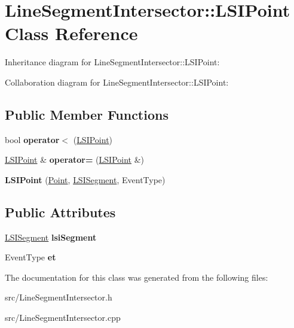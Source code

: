 \hypertarget{classLineSegmentIntersector_1_1LSIPoint}{}\section{Line\+Segment\+Intersector\+:\+:L\+S\+I\+Point Class Reference}
\label{classLineSegmentIntersector_1_1LSIPoint}


Inheritance diagram for Line\+Segment\+Intersector\+:\+:L\+S\+I\+Point\+:


Collaboration diagram for Line\+Segment\+Intersector\+:\+:L\+S\+I\+Point\+:
\subsection*{Public Member Functions}
\begin{DoxyCompactItemize}
\item 
\mbox{\label{classLineSegmentIntersector_1_1LSIPoint_a1b3ac13032c42bad86516cbcf953db66}} 
bool {\bfseries operator$<$} (\hyperlink{classLineSegmentIntersector_1_1LSIPoint}{L\+S\+I\+Point})
\item 
\mbox{\label{classLineSegmentIntersector_1_1LSIPoint_ac547954aaa117fd416bb84a4a7447e56}} 
\hyperlink{classLineSegmentIntersector_1_1LSIPoint}{L\+S\+I\+Point} \& {\bfseries operator=} (\hyperlink{classLineSegmentIntersector_1_1LSIPoint}{L\+S\+I\+Point} \&)
\item 
\mbox{\label{classLineSegmentIntersector_1_1LSIPoint_a00b901f7dd62d86e3523c6592e9c1514}} 
{\bfseries L\+S\+I\+Point} (\hyperlink{classPoint}{Point}, \hyperlink{classLineSegmentIntersector_1_1LSISegment}{L\+S\+I\+Segment}, Event\+Type)
\end{DoxyCompactItemize}
\subsection*{Public Attributes}
\begin{DoxyCompactItemize}
\item 
\mbox{\label{classLineSegmentIntersector_1_1LSIPoint_ab84e13cb9e39eeca6d8af71d4b09582d}} 
\hyperlink{classLineSegmentIntersector_1_1LSISegment}{L\+S\+I\+Segment} {\bfseries lsi\+Segment}
\item 
\mbox{\label{classLineSegmentIntersector_1_1LSIPoint_a01054b1139f1e58e5af7b45213dd3c57}} 
Event\+Type {\bfseries et}
\end{DoxyCompactItemize}


The documentation for this class was generated from the following files\+:\begin{DoxyCompactItemize}
\item 
src/Line\+Segment\+Intersector.\+h\item 
src/Line\+Segment\+Intersector.\+cpp\end{DoxyCompactItemize}
